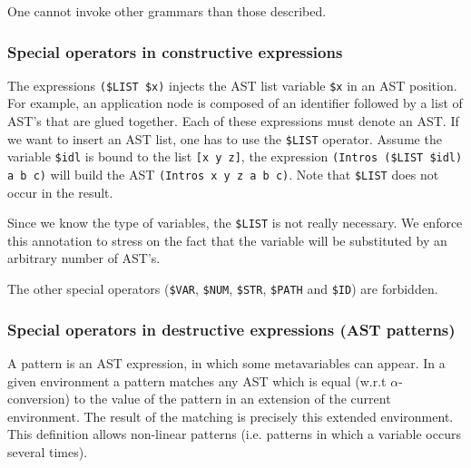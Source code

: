 \Warning
One cannot invoke other grammars than those described.

\subsubsection{Special operators in constructive expressions}

The expressions \verb+($LIST $x)+ injects the AST list variable
{\tt\$x} in an AST position. For example, an application node is
composed of an identifier followed by a list of AST's that are glued
together. Each of these expressions must denote an AST. If we want to
insert an AST list, one has to use the \verb+$LIST+ operator. Assume
the variable \verb+$idl+ is bound to the list \verb+[x y z]+, the
expression \verb+(Intros ($LIST $idl) a b c)+ will build the AST
\verb+(Intros x y z a b c)+. Note that \verb+$LIST+ does not occur in
the result.

Since we know the type of variables, the \verb+$LIST+
is not really
necessary. We enforce this annotation to stress on the fact that the
variable will be substituted by an arbitrary number of AST's.

The other special operators ({\tt\$VAR}, {\tt\$NUM}, {\tt\$STR},
{\tt\$PATH} and {\tt\$ID}) are forbidden.

\subsubsection{Special operators in destructive expressions (AST patterns)}
\label{patternsyntax}


A pattern is an AST expression, in which some metavariables can
appear. In a given environment a pattern matches any AST which is
equal (w.r.t $\alpha$-conversion) to the value of the pattern in an
extension of the current environment. The result of the matching is
precisely this extended environment. This definition allows
non-linear patterns (i.e. patterns in which a variable occurs several
times).

